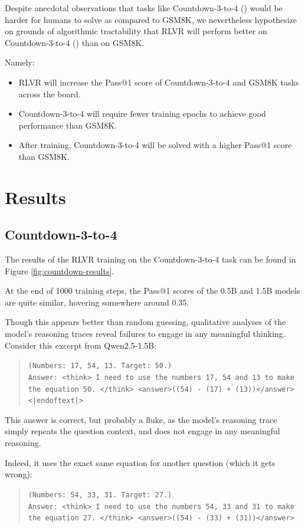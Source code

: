 \documentclass{article} %
\theoremstyle{definition}
\begin{document}
Despite anecdotal observations that tasks like Countdown-3-to-4 (\cite{countdown}) would 
be harder for humans to solve as compared to GSM8K, we nevertheless hypothesize
on grounds of algorithmic tractability that RLVR will perform better on Countdown-3-to-4 (\cite{countdown}) than on GSM8K.

Namely:
\begin{itemize}
    \item RLVR will increase the Pass@1 score of Countdown-3-to-4 and GSM8K tasks across the board.
    \item Countdown-3-to-4 will require fewer training epochs to achieve good performance than GSM8K.
    \item After training, Countdown-3-to-4 will be solved with a higher Pass@1 score than GSM8K.
\end{itemize}

\section{Results}

\subsection{Countdown-3-to-4}

The results of the RLVR training on the Countdown-3-to-4 task can be found in Figure \ref{fig:countdown-results}.

At the end of 1000 training steps, the Pass@1 scores of the 0.5B and 1.5B models 
are quite similar, hovering somewhere around 0.35. 

Though this appears better than random guessing, qualitative analyses of the model's 
reasoning traces reveal failures to engage in any meaningful thinking. 
Consider this excerpt from Qwen2.5-1.5B:
\begin{quote}
    \texttt{(Numbers: 17, 54, 13. Target: 50.)} \\
    \texttt{Answer: <think> I need to use the numbers 17, 54 and 13 to make the equation 50. </think>
<answer>((54) - (17) + (13))</answer><|endoftext|>}
\end{quote}
This answer is correct, but probably a fluke, as the model's reasoning trace 
simply repeats the question context, and does not engage in any meaningful reasoning.

Indeed, it uses the exact same equation for another question (which it gets wrong):
\begin{quote}
    \texttt{(Numbers: 54, 33, 31. Target: 27.)} \\
    \texttt{Answer: <think> I need to use the numbers 54, 33 and 31 to make the equation 27. </think>
    <answer>((54) - (33) + (31))</answer>}
\end{quote}
\end{document}
